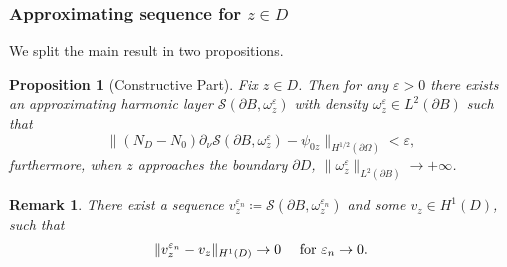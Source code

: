 \documentclass[10pt]{beamer}
\newtheorem{proposition}[subsection]{Proposition}
\theoremstyle{plain}
\newtheorem{remark}[subsection]{Remark}
\theoremstyle{plain}
\let\epsilon\varepsilon
\begin{document}
\begin{frame}
 \frametitle{Approximating sequence for $z\in D$}
 We split the main result in two propositions.
\begin{proposition}[Constructive Part]
\label{prop:lsm-constructive}
Fix $z \in D$. Then for any $\epsilon > 0$ there exists an approximating harmonic layer $\mathcal{S}(\partial B, \omega^\epsilon_z)$ with density $\omega^\epsilon_z\in L^2(\partial B)$  such that
\begin{equation}
 \|({N_D} - {N_0})\partial_\nu\mathcal{S}(\partial B, \omega^\epsilon_z) - \psi_{0z}\|_{H^{1/2}(\partial\Omega)} < \epsilon,
\end{equation}
furthermore, when $z$ approaches the boundary $\partial D$, $\|\omega^\epsilon_z\|_{L^2(\partial B)}\to + \infty$.
\end{proposition}
\begin{remark}
 There exist a sequence 
 $v^{\epsilon_n}_z\coloneqq\mathcal{S}(\partial B, \omega^{\epsilon_n}_z)$ 
 and some
 $ v_z\in H^1(D)$, such that
\begin{equation}
 \|v^{\epsilon_n}_z - v_z\|_{H^1(D)} \to 0\quad\textup{ for }\epsilon_n \to 0.
\end{equation}
\end{remark}

\end{frame}
\end{document}
